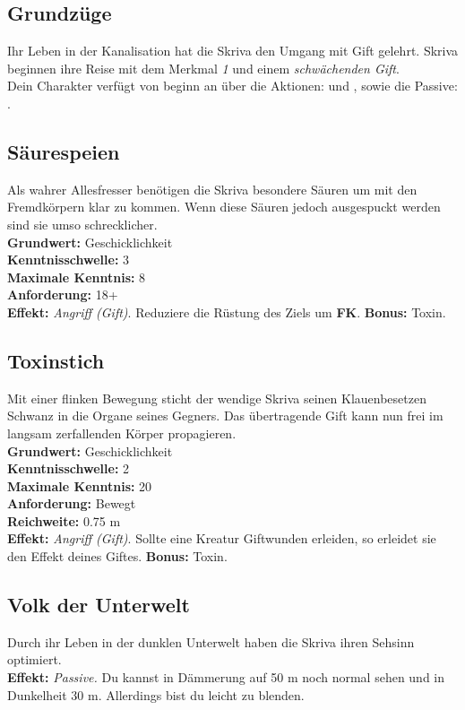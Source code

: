 \subsection*{Grundzüge}
Ihr Leben in der Kanalisation hat die Skriva den Umgang mit Gift gelehrt.
Skriva beginnen ihre Reise mit dem Merkmal \textit{ 1} und einem \textit{schwächenden Gift}.\\
Dein Charakter verfügt von beginn an über die Aktionen:  und  , sowie die Passive: .

\subsection*{Säurespeien} \label{sk:saeurespeien}
Als wahrer Allesfresser benötigen die Skriva besondere Säuren um mit den Fremdkörpern klar zu kommen. Wenn diese Säuren jedoch ausgespuckt werden sind sie umso schrecklicher.\\
\textbf{Grundwert:} Geschicklichkeit \\
\textbf{Kenntnisschwelle:} 3 \\
\textbf{Maximale Kenntnis:} 8 \\
\textbf{Anforderung:} 18+ \\
\textbf{Effekt:} \textit{Angriff (Gift)}. Reduziere die Rüstung des Ziels um \textbf{FK}. \textbf{Bonus:} Toxin.

\subsection*{Toxinstich} \label{sk:toxinstich}
Mit einer flinken Bewegung sticht der wendige Skriva seinen Klauenbesetzen Schwanz in die Organe seines Gegners. Das übertragende Gift kann nun frei im langsam zerfallenden Körper propagieren.\\
\textbf{Grundwert:} Geschicklichkeit \\
\textbf{Kenntnisschwelle:} 2 \\
\textbf{Maximale Kenntnis:} 20 \\
\textbf{Anforderung:} Bewegt \\
\textbf{Reichweite:} 0.75 m \\
\textbf{Effekt:} \textit{Angriff (Gift)}. Sollte eine Kreatur Giftwunden erleiden, so erleidet sie den Effekt deines Giftes. \textbf{Bonus:} Toxin.

\subsection*{Volk der Unterwelt} \label{sk:volk_der_unterwelt}
Durch ihr Leben in der dunklen Unterwelt haben die Skriva ihren Sehsinn optimiert.\\
\textbf{Effekt:} \textit{Passive.} Du kannst in Dämmerung auf 50 m noch normal sehen und in Dunkelheit 30 m. Allerdings bist du leicht zu blenden.

